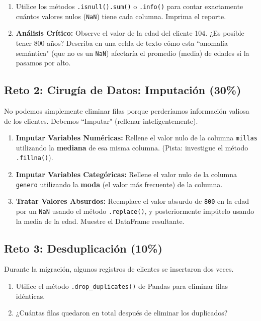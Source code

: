 \documentclass[12pt,a4paper]{article}
\begin{document}
\begin{enumerate}
    \item Utilice los métodos \texttt{.isnull().sum()} o \texttt{.info()} para contar exactamente cuántos valores nulos (\texttt{NaN}) tiene cada columna. Imprima el reporte.
    \item \textbf{Análisis Crítico:} Observe el valor de la edad del cliente 104. ¿Es posible tener 800 años? Describa en una celda de texto cómo esta ``anomalía semántica" (que no es un \texttt{NaN}) afectaría el promedio (media) de edades si la pasamos por alto.
\end{enumerate}

\subsection*{Reto 2: Cirugía de Datos: Imputación (30\%)}
No podemos simplemente eliminar filas porque perderíamos información valiosa de los clientes. Debemos ``Imputar" (rellenar inteligentemente).
\begin{enumerate}
    \item \textbf{Imputar Variables Numéricas:} Rellene el valor nulo de la columna \texttt{millas} utilizando la \textbf{mediana} de esa misma columna. (Pista: investigue el método \texttt{.fillna()}).
    \item \textbf{Imputar Variables Categóricas:} Rellene el valor nulo de la columna \texttt{genero} utilizando la \textbf{moda} (el valor más frecuente) de la columna.
    \item \textbf{Tratar Valores Absurdos:} Reemplace el valor absurdo de \texttt{800} en la edad por un \texttt{NaN} usando el método \texttt{.replace()}, y posteriormente impútelo usando la media de la edad. Muestre el DataFrame resultante.
\end{enumerate}

\subsection*{Reto 3: Desduplicación (10\%)}
Durante la migración, algunos registros de clientes se insertaron dos veces. 
\begin{enumerate}
    \item Utilice el método \texttt{.drop\_duplicates()} de Pandas para eliminar filas idénticas.
    \item ¿Cuántas filas quedaron en total después de eliminar los duplicados?
\end{enumerate}
\end{document}
